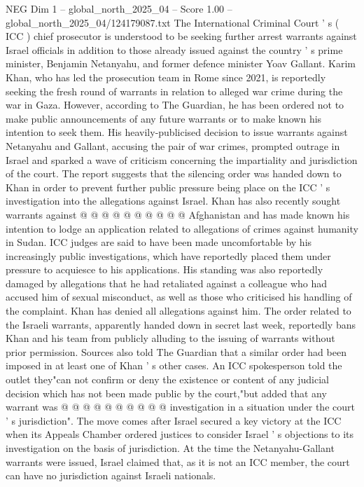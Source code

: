 \begin{textsample}{NEG Dim 1 – global\_north\_2025\_04 – Score 1.00 – global\_north\_2025\_04/124179087.txt}  \label{ex:f1_neg_103}
The International Criminal Court ' s ( ICC ) chief prosecutor is understood to be seeking further arrest warrants against Israel officials in addition to those already issued against the country ' s prime minister, Benjamin Netanyahu, and former defence minister Yoav Gallant.
Karim Khan, who has led the prosecution team in Rome since 2021, is reportedly seeking the fresh round of warrants in relation to alleged war crime during the war in Gaza.
However, according to The Guardian, he has been ordered not to make public announcements of any future warrants or to make known his intention to seek them.
His heavily-publicised decision to issue warrants against Netanyahu and Gallant, accusing the pair of war crimes, prompted outrage in Israel and sparked a wave of criticism concerning the impartiality and jurisdiction of the court.
The report suggests that the silencing order was handed down to Khan in order to prevent further public pressure being place on the ICC ' s investigation into the allegations against Israel.
Khan has also recently sought warrants against @ @ @ @ @ @ @ @ @ @ Afghanistan and has made known his intention to lodge an application related to allegations of crimes against humanity in Sudan.
ICC judges are said to have been made uncomfortable by his increasingly public investigations, which have reportedly placed them under pressure to acquiesce to his applications.
His standing was also reportedly damaged by allegations that he had retaliated against a colleague who had accused him of sexual misconduct, as well as those who criticised his handling of the complaint.
Khan has denied all allegations against him.
The order related to the Israeli warrants, apparently handed down in secret last week, reportedly bans Khan and his team from publicly alluding to the issuing of warrants without prior permission.
Sources also told The Guardian that a similar order had been imposed in at least one of Khan ' s other cases.
An ICC spokesperson told the outlet they"can not confirm or deny the existence or content of any judicial decision which has not been made public by the court,"but added that any warrant was @ @ @ @ @ @ @ @ @ @ investigation in a situation under the court ' s jurisdiction".
The move comes after Israel secured a key victory at the ICC when its Appeals Chamber ordered justices to consider Israel ' s objections to its investigation on the basis of jurisdiction.
At the time the Netanyahu-Gallant warrants were issued, Israel claimed that, as it is not an ICC member, the court can have no jurisdiction against Israeli nationals.

\end{textsample}
